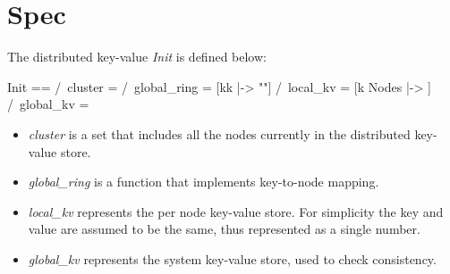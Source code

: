 


\section{Spec}

The distributed key-value \textit{Init} is defined below:\\

\begin{tla}
Init ==
    /\ cluster = {}
    /\ global_ring = [kk \in {} |-> ""]
    /\ local_kv = [k \in Nodes |-> {}]
    /\ global_kv = {}
\end{tla}
\begin{tlatex}
%
%
%
\end{tlatex}

\begin{itemize}
    \item \textit{cluster} is a set that includes all the nodes currently in the distributed key-value store.
    \item \textit{global\_ring} is a function that implements key-to-node mapping.
    \item \textit{local\_kv} represents the per node key-value store. For
    simplicity the key and value are assumed to be the same, thus represented
    as a single number.
    \item \textit{global\_kv} represents the system key-value store, used to check consistency.
\end{itemize}

